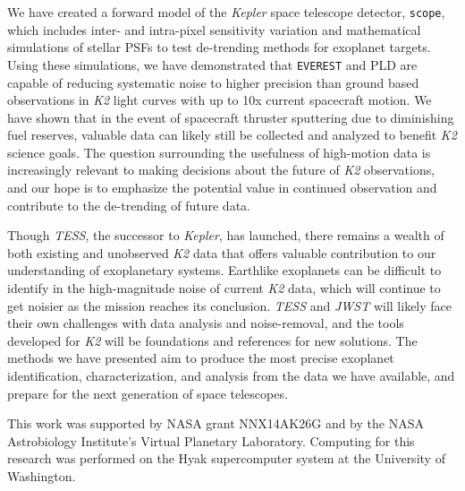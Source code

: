 \documentclass[12pt,preprint]{aastex}
\begin{document}
We have created a forward model of the \textit{Kepler} space telescope detector, \texttt{scope}, which includes inter- and intra-pixel sensitivity variation and mathematical simulations of stellar PSFs to test de-trending methods for exoplanet targets. Using these simulations, we have demonstrated that \texttt{EVEREST} and PLD are  capable of reducing systematic noise to higher precision than ground based observations in \textit{K2} light curves with up to 10x current spacecraft motion. We have shown that in the event of spacecraft thruster sputtering due to diminishing fuel reserves, valuable data can likely still be collected and analyzed to benefit \textit{K2} science goals. The question surrounding the usefulness of high-motion data is increasingly relevant to making decisions about the future of \textit{K2} observations, and our hope is to emphasize the potential value in continued observation and contribute to the de-trending of future data.

Though \textit{TESS}, the successor to \textit{Kepler}, has launched, there remains a wealth of both existing and unobserved \textit{K2} data that offers valuable contribution to our understanding of exoplanetary systems. Earthlike exoplanets can be difficult to identify in the high-magnitude noise of current \textit{K2} data, which will continue to get noisier as the mission reaches its conclusion. \textit{TESS} and \textit{JWST} will likely face their own challenges with data analysis and noise-removal, and the tools developed for \textit{K2} will be foundations and references for new solutions. The methods we have presented aim to produce the most precise exoplanet identification, characterization, and analysis from the data we have available, and prepare for the next generation of space telescopes.

This work was supported by NASA grant NNX14AK26G and by the NASA Astrobiology Institute's Virtual Planetary Laboratory. Computing for this research was performed on the Hyak supercomputer system at the University of Washington.

\clearpage


\end{document}
